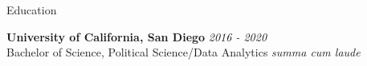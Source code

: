 \documentclass[10pt]{resume} %
\begin{document}
	
	
	\begin{rSection}{Education}
		
		{\bf University of California, San Diego} \hfill {\em 2016 - 2020} 
		\\ Bachelor of Science, Political Science/Data Analytics \hfill {\em summa cum laude}
		
	\end{rSection}
	
	
\end{document}
